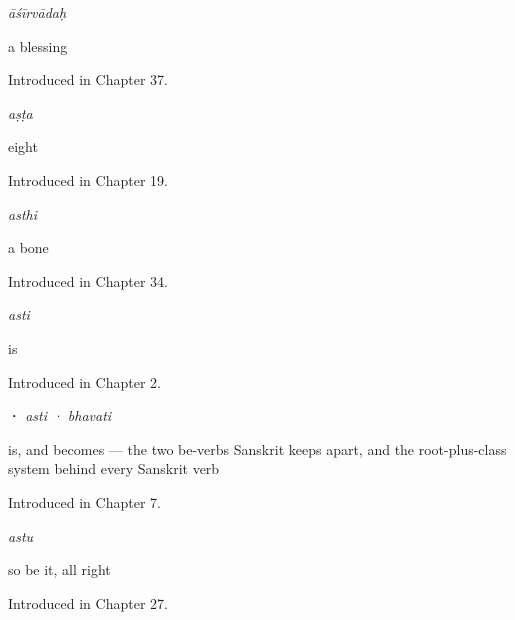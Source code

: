 \noindent\begin{minipage}[t]{\linewidth}
\raggedright
\textbf{}\enspace\emph{āśīrvādaḥ}\par
\small a blessing\par
\footnotesize Introduced in Chapter 37.
\end{minipage}\par\medskip

\noindent\begin{minipage}[t]{\linewidth}
\raggedright
\textbf{}\enspace\emph{aṣṭa}\par
\small eight\par
\footnotesize Introduced in Chapter 19.
\end{minipage}\par\medskip

\noindent\begin{minipage}[t]{\linewidth}
\raggedright
\textbf{}\enspace\emph{asthi}\par
\small a bone\par
\footnotesize Introduced in Chapter 34.
\end{minipage}\par\medskip

\noindent\begin{minipage}[t]{\linewidth}
\raggedright
\textbf{}\enspace\emph{asti}\par
\small is\par
\footnotesize Introduced in Chapter 2.
\end{minipage}\par\medskip

\noindent\begin{minipage}[t]{\linewidth}
\raggedright
\textbf{ · }\enspace\emph{asti · bhavati}\par
\small is, and becomes — the two be-verbs Sanskrit keeps apart, and the root-plus-class system behind every Sanskrit verb\par
\footnotesize Introduced in Chapter 7.
\end{minipage}\par\medskip

\noindent\begin{minipage}[t]{\linewidth}
\raggedright
\textbf{}\enspace\emph{astu}\par
\small so be it, all right\par
\footnotesize Introduced in Chapter 27.
\end{minipage}\par\medskip

